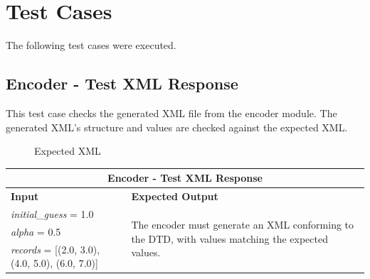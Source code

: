 \section{Test Cases}
The following test cases were executed.
\subsection{Encoder - Test XML Response}
\begin{flushleft}
This test case checks the generated XML file from the encoder module. 
The generated XML’s structure and values are checked against the expected XML.

\vspace*{1em}

\begin{figure}[h!]
    \centering
    \caption{Expected XML}
    \label{fig:XML output}
  \end{figure}

\vspace*{1em}

\begin{tabular}{ |p{6cm}||p{6cm} |  }
    \hline
    \multicolumn{2}{|c|}{\textbf{Encoder - Test XML Response}} \\
    \hline
    \textbf{Input} & \textbf{Expected Output}\\
    \hline
    \textit{initial\_guess} = 1.0   & \multirow{3}{15em}{The encoder must generate an XML conforming to the DTD, with values matching the expected values.} \\
    \textit{alpha} = 0.5 &   \\
    \textit{records} = [(2.0, 3.0), (4.0, 5.0), (6.0, 7.0)] & \\
    
    \hline
\end{tabular}
\end{flushleft}



